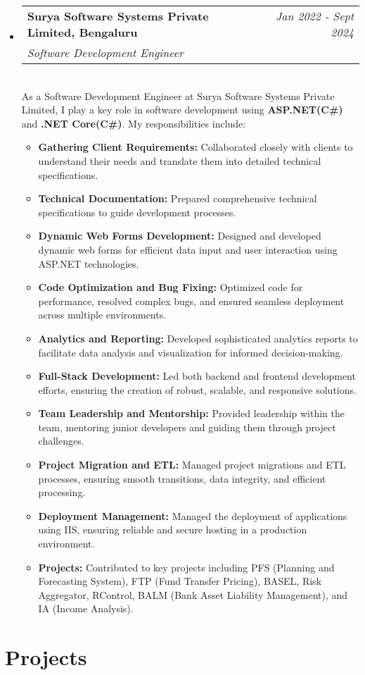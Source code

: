 \documentclass[a4paper,12pt]{article}
\makeatletter
\newcommand{\resumeSubHeadingListStart}{\begin{itemize}[leftmargin=*,labelsep=1mm,noitemsep]}
\newcommand{\resumeSubHeadingListEnd}{\end{itemize}\vspace{2mm}}
\newcommand{\resumeItemListStart}{\begin{itemize}[leftmargin=3ex, rightmargin=2ex, noitemsep,labelsep=1.2mm,itemsep=0mm]\small}
\newcommand{\resumeItemListEnd}{\end{itemize}\vspace{-2mm}}
\newcommand{\resumeExperience}[4]{
\vspace{0.5mm}\item
    \begin{tabular*}{0.98\textwidth}[t]{l@{\extracolsep{\fill}}r}
        \textbf{#1} & \textit{\footnotesize{#3}}\\
        \textit{\footnotesize{#2}} & {}
    \end{tabular*}\\ [1mm]
    \footnotesize{#4}
}
\newcommand{\emptyLine}{\\[-3mm]}
\makeatother
\begin{document}
\resumeSubHeadingListStart
\resumeExperience {Surya Software Systems Private Limited, Bengaluru}
 {Software Development Engineer} {Jan 2022 - Sept 2024}
{
As a Software Development Engineer at Surya Software Systems Private Limited, I play a key role in software development using \textbf{ASP.NET(C\#)} and \textbf{.NET Core(C\#)}. My responsibilities include:
}\emptyLine
\resumeItemListStart
    \item \textbf{Gathering Client Requirements:} Collaborated closely with clients to understand their needs and translate them into detailed technical specifications.
    \item \textbf{Technical Documentation:} Prepared comprehensive technical specifications to guide development processes.
    \item \textbf{Dynamic Web Forms Development:} Designed and developed dynamic web forms for efficient data input and user interaction using ASP.NET technologies.
    \item \textbf{Code Optimization and Bug Fixing:} Optimized code for performance, resolved complex bugs, and ensured seamless deployment across multiple environments.
    \item \textbf{Analytics and Reporting:} Developed sophisticated analytics reports to facilitate data analysis and visualization for informed decision-making.
    \item \textbf{Full-Stack Development:} Led both backend and frontend development efforts, ensuring the creation of robust, scalable, and responsive solutions.
    \item \textbf{Team Leadership and Mentorship:} Provided leadership within the team, mentoring junior developers and guiding them through project challenges.
    \item \textbf{Project Migration and ETL:} Managed project migrations and ETL processes, ensuring smooth transitions, data integrity, and efficient processing.
    \item \textbf{Deployment Management:} Managed the deployment of applications using IIS, ensuring reliable and secure hosting in a production environment.
    \item \textbf{Projects:} Contributed to key projects including PFS (Planning and Forecasting System), FTP (Fund Transfer Pricing), BASEL, Risk Aggregator, RControl, BALM (Bank Asset Liability Management), and IA (Income Analysis).
    \resumeItemListEnd
\resumeSubHeadingListEnd

\section{Projects}
\end{document}
